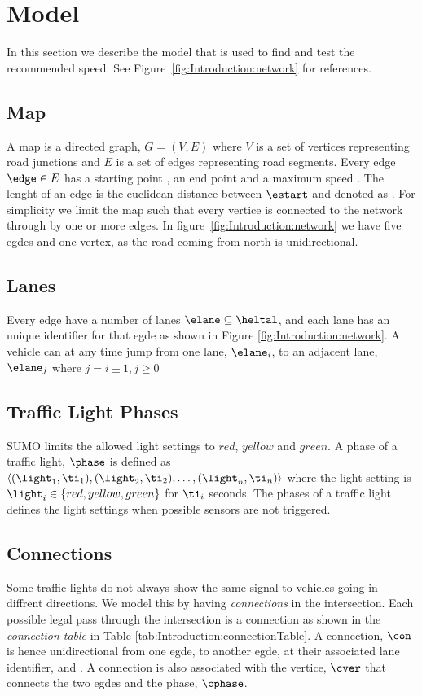 \section{Model}
In this section we describe the model that is used to find and test the recommended speed.
See Figure~\ref{fig:Introduction:network} for references.

\subsection{Map}
A map is a directed graph, $G = (V, E)$ where $V$ is a set of vertices representing road junctions and $E$ is a set of edges representing road segments.
Every edge $\edge\in E$ has a starting point \estart, an end point \eend and a maximum speed \espeed. 
The lenght of an edge is the euclidean distance between $\estart$ and \eend denoted as \elength.
For simplicity we limit the map such that every vertice is connected to the network through by one or more edges.
In figure~\ref{fig:Introduction:network} we have five egdes and one vertex, as the road coming from north is unidirectional.

\subsection{Lanes}
Every edge have a number of lanes $\elane \subseteq \heltal$, and each lane has an unique identifier for that egde as shown in Figure \ref{fig:Introduction:network}. 
A vehicle can at any time jump from one lane, $\elane_i$, to an adjacent lane, $\elane_j$ where $j=i\pm1, j\geq 0$

\subsection{Traffic Light Phases}
SUMO limits the allowed light settings to $red$, $yellow$ and $green$.
A phase of a traffic light, $\phase$ is defined as $\langle(\light_1, \ti_1),(\light_2, \ti_2),\dots, (\light_n, \ti_n) \rangle$ where the light setting is $\light_i\in \{red, yellow, green\}$ for $\ti_i$ seconds.
The phases of a traffic light defines the light settings when possible sensors are not triggered.

\subsection{Connections}
Some traffic lights do not always show the same signal to vehicles going in diffrent directions.
We model this by having \textit{connections} in the intersection. 
Each possible legal pass through the intersection is a connection as shown in the \textit{connection table} in Table \ref{tab:Introduction:connectionTable}. 
A connection, $\con$ is hence unidirectional from one egde, \cestart to another egde, \ceend at their associated lane identifier, \clstart and \clend. 
A connection is also associated with the vertice, $\cver$ that connects the two egdes and the phase, $\cphase$.

